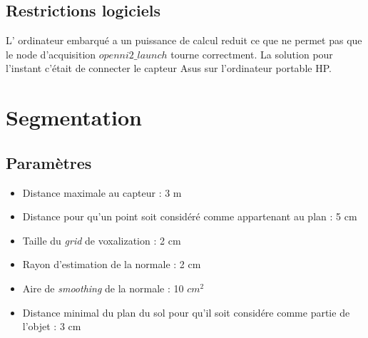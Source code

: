 \begin{figure}[H]
\end{figure}

\begin{figure}[H]
\end{figure}


\subsection{Restrictions logiciels}
L' ordinateur embarqué a un puissance de calcul reduit ce que ne permet pas que le node d'acquisition \(openni2\_launch\) tourne correctment. La solution pour l'instant c'était de connecter le capteur Asus sur l'ordinateur portable HP.

\section{ Segmentation }

\subsection{ Paramètres }

\begin{itemize}
\item Distance maximale au capteur : 3 m
\item Distance pour qu'un point soit considéré comme appartenant au plan : 5 cm
\item Taille du \textit{grid} de voxalization : 2 cm
\item Rayon d'estimation de la normale : 2 cm
\item Aire de \textit{smoothing} de la normale : 10 $cm^2$
\item Distance minimal du plan du sol pour qu'il soit considére comme partie de l'objet : 3 cm
\end{itemize}

